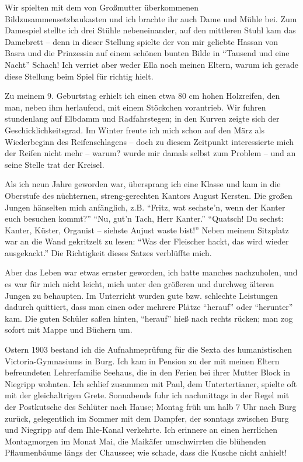 Wir spielten mit dem von Großmutter überkommenen Bildzusammensetzbaukasten und ich brachte ihr auch Dame und Mühle bei. Zum Damespiel stellte ich drei Stühle nebeneinander, auf den mittleren Stuhl kam das Damebrett -- denn in dieser Stellung spielte der von mir geliebte Hassan von Basra und die Prinzessin auf einem schönen bunten Bilde in \enquote{Tausend und eine Nacht} Schach! Ich verriet aber weder Ella noch meinen Eltern, warum ich gerade diese Stellung beim Spiel für richtig hielt.

Zu meinem 9. Geburtstag erhielt ich einen etwa 80 cm hohen Holzreifen, den man, neben ihm herlaufend, mit einem Stöckchen vorantrieb. Wir fuhren stundenlang auf Elbdamm und Radfahrstegen; in den Kurven zeigte sich der Geschicklichkeitsgrad. Im Winter freute ich mich schon auf den März als Wiederbeginn des Reifenschlagens -- doch zu diesem Zeitpunkt interessierte mich der Reifen nicht mehr -- warum? wurde mir damals selbst zum Problem -- und an seine Stelle trat der Kreisel.

Als ich neun Jahre geworden war, übersprang ich eine Klasse und kam in die Oberstufe des nüchternen, streng-gerechten Kantors August Kersten. Die großen Jungen hänselten mich anfänglich, z.B. \enquote{Fritz, wat sechste'n, wenn der Kanter euch besuchen kommt?} \enquote{Nu, gut'n Tach, Herr Kanter.} \enquote{Quatsch! Du sechst: Kanter, Küster, Organist -- siehste Aujust waste bist!} Neben meinem Sitzplatz war an die Wand gekritzelt zu lesen: \enquote{Was der Fleischer hackt, das wird wieder ausgekackt.} Die Richtigkeit dieses Satzes verblüffte mich.

Aber das Leben war etwas ernster geworden, ich hatte manches nachzuholen, und es war für mich nicht leicht, mich unter den größeren und durchweg älteren Jungen zu behaupten. Im Unterricht wurden gute bzw. schlechte Leistungen dadurch quittiert, dass man einen oder mehrere Plätze \enquote{herauf} oder \enquote{herunter} kam. Die guten Schüler saßen hinten, \enquote{herauf} hieß nach rechts rücken; man zog sofort mit Mappe und Büchern um.

Ostern 1903 bestand ich die Aufnahmeprüfung für die Sexta des humanistischen Victoria-Gymnasiums in Burg. Ich kam in Pension zu der mit meinen Eltern befreundeten Lehrerfamilie Seehaus, die in den Ferien bei ihrer Mutter Block in Niegripp wohnten. Ich schlief zusammen mit Paul, dem Untertertianer, spielte oft mit der gleichaltrigen Grete. Sonnabends fuhr ich nachmittags in der Regel mit der Postkutsche des Schlüter nach Hause; Montag früh um halb 7 Uhr nach Burg zurück, gelegentlich im Sommer mit dem Dampfer, der sonntags zwischen Burg und Niegripp auf dem Ihle-Kanal verkehrte. Ich erinnere an einen herrlichen Montagmorgen im Monat Mai, die Maikäfer umschwirrten die blühenden Pflaumenbäume längs der Chaussee; wie schade, dass die Kusche nicht anhielt!

